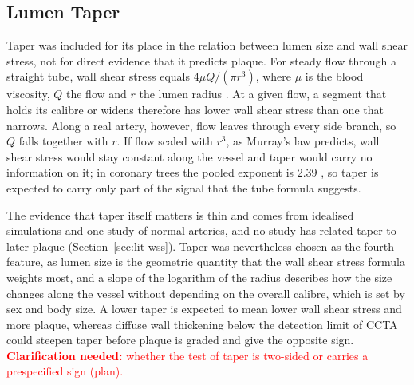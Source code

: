 \providecommand{\clarify}[1]{\textcolor{red}{\textbf{Clarification needed:} #1}}
\subsection{Lumen Taper}
\label{sec:method-taper}

Taper was included for its place in the relation between lumen size and wall shear stress, not for direct evidence that it predicts plaque.
For steady flow through a straight tube, wall shear stress equals $4\mu Q/(\pi r^3)$, where $\mu$ is the blood viscosity, $Q$ the flow and $r$ the lumen radius \cite{malek1999shear}.
At a given flow, a segment that holds its calibre or widens therefore has lower wall shear stress than one that narrows.
Along a real artery, however, flow leaves through every side branch, so $Q$ falls together with $r$.
If flow scaled with $r^3$, as Murray's law predicts, wall shear stress would stay constant along the vessel and taper would carry no information on it; in coronary trees the pooled exponent is 2.39 \cite{taylor2024murray}, so taper is expected to carry only part of the signal that the tube formula suggests.

The evidence that taper itself matters is thin and comes from idealised simulations and one study of normal arteries, and no study has related taper to later plaque (Section~\ref{sec:lit-wss}).
Taper was nevertheless chosen as the fourth feature, as lumen size is the geometric quantity that the wall shear stress formula weights most, and a slope of the logarithm of the radius describes how the size changes along the vessel without depending on the overall calibre, which is set by sex and body size.
A lower taper is expected to mean lower wall shear stress and more plaque, whereas diffuse wall thickening below the detection limit of CCTA could steepen taper before plaque is graded and give the opposite sign.
\clarify{whether the test of taper is two-sided or carries a prespecified sign (plan).}

